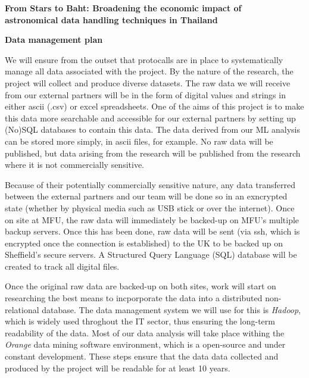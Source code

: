 \documentclass[11pt]{article}
\begin{document}
\setcounter{figure}{0}
\noindent
{\LARGE \bf From Stars to Baht: Broadening the economic impact of \\
astronomical data handling techniques in Thailand}

\vspace{3mm}
\noindent
{\LARGE \bf Data management plan}

\vspace{3mm}
\noindent
We will ensure from the outset that protocalls are in place to systematically manage all data associated with the project. By the nature of the research, the project will collect and produce diverse datasets. The raw data we will receive from our external partners will be in the form of digital values and strings in either ascii (.csv) or excel spreadsheets. One of the aims of this project is to make this data more searchable and accessible for our external partners by setting up (No)SQL databases to contain this data. The data derived from our ML analysis can be stored more simply, in ascii files, for example. No raw data will be published, but data arising from the research will be published from the research where it is not commercially sensitive.

\vspace{2mm}
\noindent
Because of their potentially commercially sensitive nature, any data transferred between the external partners and our team will be done so in an exncrypted state (whether by physical media such as USB stick or over the internet). Once on site at MFU, the raw data will immediately be backed-up on MFU's multiple backup servers. Once this has been done, raw data will be sent (via ssh, which is encrypted once the connection is established) to the UK to be backed up on Sheffield's secure servers. A Structured Query Language (SQL) database will be created to track all digital files.

\vspace{2mm}
\noindent
Once the original raw data are backed-up on both sites, work will start on researching the best means to incporporate the data into a distributed non-relational database. The data management system we will use for this is {\it Hadoop}, which is widely used throghout the IT sector, thus ensuring the long-term readability of the data. Most of our data analysis will take place withing the {\it Orange} data mining software environment, which is a open-source and under constant development. These steps ensure that the data data collected and produced by the project will be readable for at least 10 years. 
\end{document}
